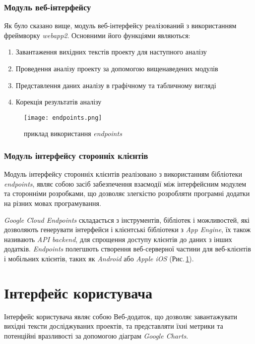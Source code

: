 \subsubsection{Модуль веб-інтерфейсу}
\label{module_web_interface}
Як було сказано вище, модуль веб-інтерфейсу реалізований з використанням фреймворку  {\itshape webapp2}. Основними його функціями являються:
\begin{enumerate}
\item Завантаження вихідних текстів проекту для наступного аналізу
\item Проведення аналізу проекту за допомогою вищенаведених модулів
\item Представлення даних аналізу в графічному та табличному вигляді
\item Корекція результатів аналізу
\end{enumerate}

\begin{figure}[h]
    \centering
    \texttt{[image: endpoints.png]}
    \caption{приклад використання {\itshape endpoints}}
    \label{fig:endpoints_image}
\end{figure}

\subsubsection{Модуль інтерфейсу сторонніх клієнтів}
\label{module_endpoints}
Модуль інтерфейсу сторонніх клієнтів реалізовано з використанням бібліотеки {\itshape endpoints}, являє собою засіб забезпечення взаємодії між інтерфейсним модулем та сторонніми розробками, що дозволяє злегкістю розробляти програмні додатки на різних мовах програмування.


{\itshape Google Cloud Endpoints} складається з інструментів, бібліотек і можливостей, які дозволяють генерувати інтерфейси і клієнтські бібліотеки з {\itshape  App Engine}, їх також називають {\itshape API backend}, для спрощення доступу клієнтів до даних з інших додатків. {\itshape Endpoints} полегшють створення веб-серверної частини для веб-клієнтів і мобільних клієнтів, таких як {\itshape Android} або {\itshape Apple iOS} (Рис.\,\ref{fig:endpoints_image}).

\pagebreak

\section{Інтерфейс користувача}
\label{3section:id3}
Інтерфейс користувача являє собою Веб-додаток, що дозволяє завантажувати вихідні тексти досліджуваних проектів, та представляти їхні метрики та потенційні вразливості за допомогою діаграм {\itshape Google Charts}.

